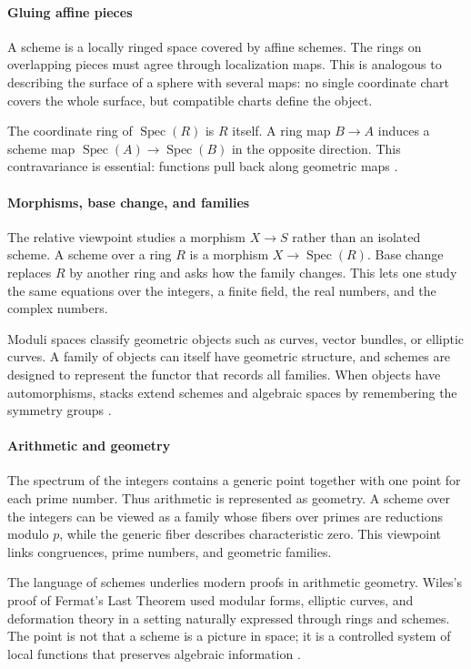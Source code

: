 \paragraph{Gluing affine pieces}
A scheme is a locally ringed space covered by affine schemes. The rings on overlapping pieces must agree through localization maps. This is analogous to describing the surface of a sphere with several maps: no single coordinate chart covers the whole surface, but compatible charts define the object.

The coordinate ring of $\operatorname{Spec}(R)$ is $R$ itself. A ring map $B\to A$ induces a scheme map $\operatorname{Spec}(A)\to\operatorname{Spec}(B)$ in the opposite direction. This contravariance is essential: functions pull back along geometric maps \cite{scheme_ref1}.

\paragraph{Morphisms, base change, and families}
The relative viewpoint studies a morphism $X\to S$ rather than an isolated scheme. A scheme over a ring $R$ is a morphism $X\to\operatorname{Spec}(R)$. Base change replaces $R$ by another ring and asks how the family changes. This lets one study the same equations over the integers, a finite field, the real numbers, and the complex numbers.

Moduli spaces classify geometric objects such as curves, vector bundles, or elliptic curves. A family of objects can itself have geometric structure, and schemes are designed to represent the functor that records all families. When objects have automorphisms, stacks extend schemes and algebraic spaces by remembering the symmetry groups \cite{scheme_ref4}.

\paragraph{Arithmetic and geometry}
The spectrum of the integers contains a generic point together with one point for each prime number. Thus arithmetic is represented as geometry. A scheme over the integers can be viewed as a family whose fibers over primes are reductions modulo $p$, while the generic fiber describes characteristic zero. This viewpoint links congruences, prime numbers, and geometric families.

The language of schemes underlies modern proofs in arithmetic geometry. Wiles's proof of Fermat's Last Theorem used modular forms, elliptic curves, and deformation theory in a setting naturally expressed through rings and schemes. The point is not that a scheme is a picture in space; it is a controlled system of local functions that preserves algebraic information \cite{scheme_ref3}.

